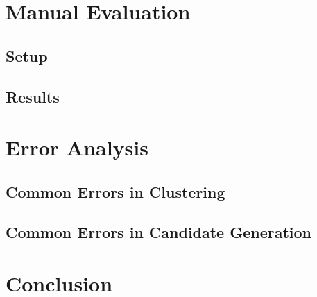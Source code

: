 \documentclass[a4paper,BCOR=10mm]{report}
\begin{document}






\chapter{Manual Evaluation}

\section{Setup}

\section{Results}

\chapter{Error Analysis}

\section{Common Errors in Clustering}

\section{Common Errors in Candidate Generation}


\chapter{Conclusion}


 
\end{document}
